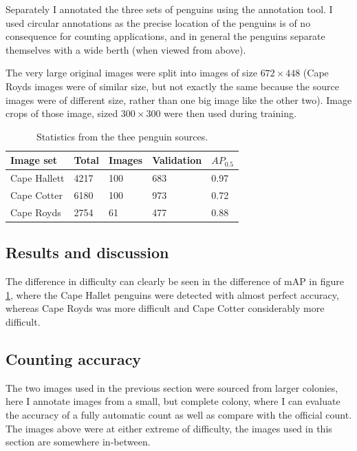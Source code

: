 Separately I annotated the three sets of penguins using the annotation tool. I used circular annotations as the precise location of the penguins is of no consequence for counting applications, and in general the penguins separate themselves with a wide berth (when viewed from above).  

The very large original images were split into images of size $ 672\times448 $ (Cape Royds images were of similar size, but not exactly the same because the source images were of different size, rather than one big image like the other two). Image crops of those image, sized $ 300\times300 $ were then used during training.

\begin{table}[ht]
  \centering
    \caption{Statistics from the thee penguin sources. }
  \begin{tabular}{ l  l  l  l  l }
    Image set & Total & Images & Validation & $AP_0.5$ \\
    \toprule
    Cape Hallett  & 4217 & 100 & 683 & 0.97 \\
    Cape Cotter   & 6180 & 100 & 973 & 0.72  \\
    Cape Royds    & 2754 & 61 & 477  & 0.88 \\
    \bottomrule
  \end{tabular}

\label{fig:penguin_statistics}
\end{table}





\subsection{Results and discussion}
 
The difference in difficulty can clearly be seen in the difference of mAP in figure \ref{fig:penguin_statistics}, where the Cape Hallet penguins were detected with almost perfect accuracy, whereas Cape Royds was more difficult and Cape Cotter considerably more difficult. 






\subsection{Counting accuracy}

The two images used in the previous section were sourced from larger colonies, here I annotate images from a small, but complete colony, where I can evaluate the accuracy of a fully automatic count as well as compare with the official count. The images above were at either extreme of difficulty, the images used in this section are somewhere in-between. 



